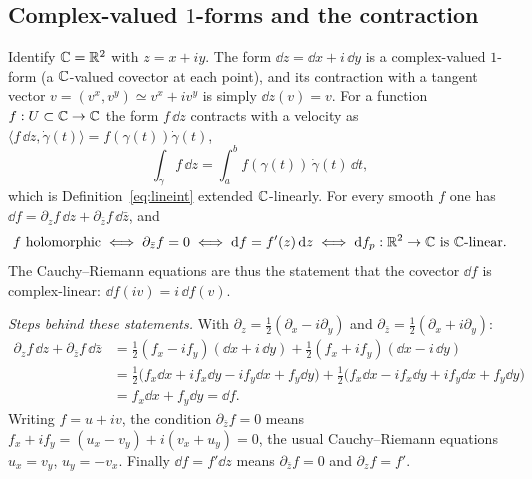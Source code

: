 \subsection{Complex-valued $1$-forms and the contraction}\label{sec:complexforms}

Identify $\mathbb{C}=\mathbb{R}^2$ with $z=x+iy$. The form $\dd z=\dd x+i\,\dd y$ is a complex-valued $1$-form (a $\mathbb{C}$-valued covector at each point), and its contraction with a tangent vector $v=(v^x,v^y)\simeq v^x+iv^y$ is simply $\dd z(v)=v$. For a function $f:U\subset\mathbb{C}\to\mathbb{C}$ the form $f\,\dd z$ contracts with a velocity as $\langle f\,\dd z,\dot\gamma(t)\rangle=f(\gamma(t))\dot\gamma(t)$,
\begin{equation}\label{eq:cint}
\int_\gamma f\,\dd z=\int_a^bf(\gamma(t))\,\dot\gamma(t)\,\dd t,
\end{equation}
which is Definition~\eqref{eq:lineint} extended $\mathbb{C}$-linearly. For every smooth $f$ one has $\dd f=\partial_zf\,\dd z+\partial_{\bar z}f\,\dd\bar z$, and
\begin{equation}\label{eq:holo}
f\text{ holomorphic}\iff\partial_{\bar z}f=0\iff\mathrm{d} f=f'(z)\,\mathrm{d} z\iff\mathrm{d} f_p:\mathbb{R}^2\to\mathbb{C}\text{ is }\mathbb{C}\text{-linear}.
\end{equation}
The Cauchy--Riemann equations are thus the statement that the covector $\dd f$ is complex-linear: $\dd f(iv)=i\,\dd f(v)$.

\emph{Steps behind these statements.} With $\partial_z=\frac12(\partial_x-i\partial_y)$ and $\partial_{\bar z}=\frac12(\partial_x+i\partial_y)$:
\begin{align*}
\partial_zf\,\dd z+\partial_{\bar z}f\,\dd\bar z&=\tfrac12(f_x-if_y)(\dd x+i\,\dd y)+\tfrac12(f_x+if_y)(\dd x-i\,\dd y)\\
&=\tfrac12\bigl(f_x\dd x+if_x\dd y-if_y\dd x+f_y\dd y\bigr)+\tfrac12\bigl(f_x\dd x-if_x\dd y+if_y\dd x+f_y\dd y\bigr)\\
&=f_x\dd x+f_y\dd y=\dd f.
\end{align*}
Writing $f=u+iv$, the condition $\partial_{\bar z}f=0$ means $f_x+if_y=(u_x-v_y)+i(v_x+u_y)=0$, \ie the usual Cauchy--Riemann equations $u_x=v_y$, $u_y=-v_x$. Finally $\dd f=f'\dd z$ means $\partial_{\bar z}f=0$ and $\partial_zf=f'$.
